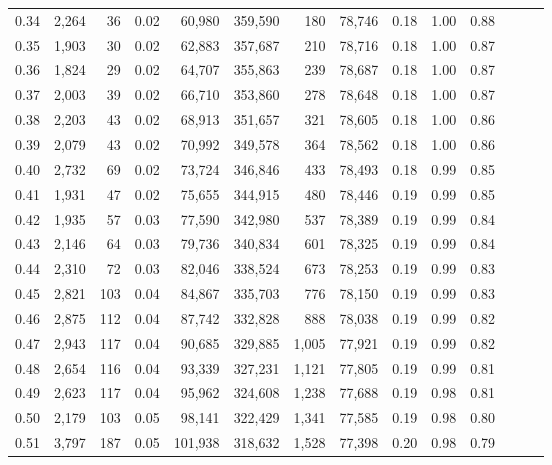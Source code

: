 \begin{tabular}{rrrrrrrrrrrrrr}
0.34 &   2,264 &     36 &  0.02 &   60,980 &  359,590 &     180 &  78,746 &  0.18 &  1.00 &      0.88 \\
0.35 &   1,903 &     30 &  0.02 &   62,883 &  357,687 &     210 &  78,716 &  0.18 &  1.00 &      0.87 \\
0.36 &   1,824 &     29 &  0.02 &   64,707 &  355,863 &     239 &  78,687 &  0.18 &  1.00 &      0.87 \\
0.37 &   2,003 &     39 &  0.02 &   66,710 &  353,860 &     278 &  78,648 &  0.18 &  1.00 &      0.87 \\
0.38 &   2,203 &     43 &  0.02 &   68,913 &  351,657 &     321 &  78,605 &  0.18 &  1.00 &      0.86 \\
0.39 &   2,079 &     43 &  0.02 &   70,992 &  349,578 &     364 &  78,562 &  0.18 &  1.00 &      0.86 \\
0.40 &   2,732 &     69 &  0.02 &   73,724 &  346,846 &     433 &  78,493 &  0.18 &  0.99 &      0.85 \\
0.41 &   1,931 &     47 &  0.02 &   75,655 &  344,915 &     480 &  78,446 &  0.19 &  0.99 &      0.85 \\
0.42 &   1,935 &     57 &  0.03 &   77,590 &  342,980 &     537 &  78,389 &  0.19 &  0.99 &      0.84 \\
0.43 &   2,146 &     64 &  0.03 &   79,736 &  340,834 &     601 &  78,325 &  0.19 &  0.99 &      0.84 \\
0.44 &   2,310 &     72 &  0.03 &   82,046 &  338,524 &     673 &  78,253 &  0.19 &  0.99 &      0.83 \\
0.45 &   2,821 &    103 &  0.04 &   84,867 &  335,703 &     776 &  78,150 &  0.19 &  0.99 &      0.83 \\
0.46 &   2,875 &    112 &  0.04 &   87,742 &  332,828 &     888 &  78,038 &  0.19 &  0.99 &      0.82 \\
0.47 &   2,943 &    117 &  0.04 &   90,685 &  329,885 &   1,005 &  77,921 &  0.19 &  0.99 &      0.82 \\
0.48 &   2,654 &    116 &  0.04 &   93,339 &  327,231 &   1,121 &  77,805 &  0.19 &  0.99 &      0.81 \\
0.49 &   2,623 &    117 &  0.04 &   95,962 &  324,608 &   1,238 &  77,688 &  0.19 &  0.98 &      0.81 \\
0.50 &   2,179 &    103 &  0.05 &   98,141 &  322,429 &   1,341 &  77,585 &  0.19 &  0.98 &      0.80 \\
0.51 &   3,797 &    187 &  0.05 &  101,938 &  318,632 &   1,528 &  77,398 &  0.20 &  0.98 &      0.79 \\

\end{tabular}
